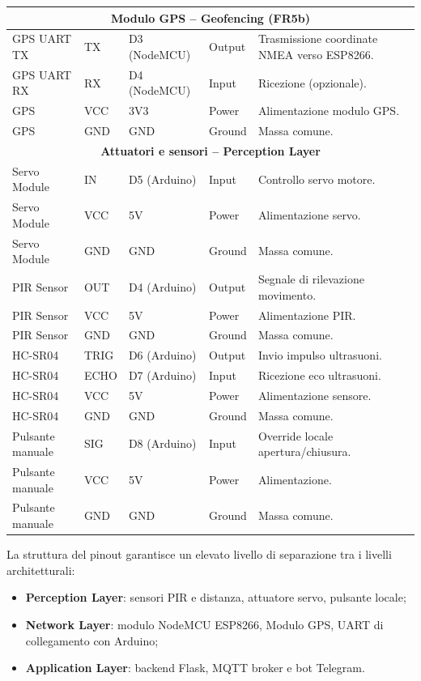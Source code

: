 \begin{table}[H]
\begin{tabular}{|p{3.2cm}|p{2cm}|p{2cm}|p{2cm}|p{4cm}|}
\multicolumn{5}{|c|}{\textbf{Modulo GPS – Geofencing (FR5b)}} \\ \hline
GPS UART TX & TX & D3 (NodeMCU) & Output & Trasmissione coordinate NMEA verso ESP8266. \\ \hline
GPS UART RX & RX & D4 (NodeMCU) & Input & Ricezione (opzionale). \\ \hline
GPS & VCC & 3V3 & Power & Alimentazione modulo GPS. \\ \hline
GPS & GND & GND & Ground & Massa comune. \\ \hline

\multicolumn{5}{|c|}{\textbf{Attuatori e sensori – Perception Layer}} \\ \hline
Servo Module & IN & D5 (Arduino) & Input & Controllo servo motore. \\ \hline
Servo Module & VCC & 5V & Power & Alimentazione servo. \\ \hline
Servo Module & GND & GND & Ground & Massa comune. \\ \hline

PIR Sensor & OUT & D4 (Arduino) & Output & Segnale di rilevazione movimento. \\ \hline
PIR Sensor & VCC & 5V & Power & Alimentazione PIR. \\ \hline
PIR Sensor & GND & GND & Ground & Massa comune. \\ \hline

HC-SR04 & TRIG & D6 (Arduino) & Output & Invio impulso ultrasuoni. \\ \hline
HC-SR04 & ECHO & D7 (Arduino) & Input & Ricezione eco ultrasuoni. \\ \hline
HC-SR04 & VCC & 5V & Power & Alimentazione sensore. \\ \hline
HC-SR04 & GND & GND & Ground & Massa comune. \\ \hline

Pulsante manuale & SIG & D8 (Arduino) & Input & Override locale apertura/chiusura. \\ \hline
Pulsante manuale & VCC & 5V & Power & Alimentazione. \\ \hline
Pulsante manuale & GND & GND & Ground & Massa comune. \\ \hline

\end{tabular}
\end{table}

La struttura del pinout garantisce un elevato livello di separazione tra i livelli architetturali:
\begin{itemize}
    \item \textbf{Perception Layer}: sensori PIR e distanza, attuatore servo, pulsante locale;
    \item \textbf{Network Layer}: modulo NodeMCU ESP8266, Modulo GPS, UART di collegamento con Arduino;
    \item \textbf{Application Layer}: backend Flask, MQTT broker e bot Telegram.
\end{itemize}

